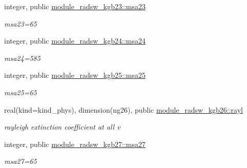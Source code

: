 \begin{DoxyCompactItemize}
\mbox{\label{namespacemodule__radsw__kgb23_a744e7ef73b8d3cc01ff9c6a6010d95d7}} 
integer, public \hyperlink{namespacemodule__radsw__kgb23_a744e7ef73b8d3cc01ff9c6a6010d95d7}{module\+\_\+radsw\+\_\+kgb23\+::msa23}
\begin{DoxyCompactList}\small\item\em msa23=65 \end{DoxyCompactList}\item 
\mbox{\label{namespacemodule__radsw__kgb24_ad416df05aed8a6ae1ecd57d5c90c223c}} 
integer, public \hyperlink{namespacemodule__radsw__kgb24_ad416df05aed8a6ae1ecd57d5c90c223c}{module\+\_\+radsw\+\_\+kgb24\+::msa24}
\begin{DoxyCompactList}\small\item\em msa24=585 \end{DoxyCompactList}\item 
\mbox{\label{namespacemodule__radsw__kgb25_afc06df1f3c3a0b2f3189424ed042973e}} 
integer, public \hyperlink{namespacemodule__radsw__kgb25_afc06df1f3c3a0b2f3189424ed042973e}{module\+\_\+radsw\+\_\+kgb25\+::msa25}
\begin{DoxyCompactList}\small\item\em msa25=65 \end{DoxyCompactList}\item 
\mbox{\label{namespacemodule__radsw__kgb26_ab090be57484d2c5b67dda3d83c1c542b}} 
real(kind=kind\+\_\+phys), dimension(ng26), public \hyperlink{namespacemodule__radsw__kgb26_ab090be57484d2c5b67dda3d83c1c542b}{module\+\_\+radsw\+\_\+kgb26\+::rayl}
\begin{DoxyCompactList}\small\item\em rayleigh extinction coefficient at all v \end{DoxyCompactList}\item 
\mbox{\label{namespacemodule__radsw__kgb27_abdab838f66aba14b64bce733f797cf26}} 
integer, public \hyperlink{namespacemodule__radsw__kgb27_abdab838f66aba14b64bce733f797cf26}{module\+\_\+radsw\+\_\+kgb27\+::msa27}
\begin{DoxyCompactList}\small\item\em msa27=65 \end{DoxyCompactList}\item 

\end{DoxyCompactItemize}
